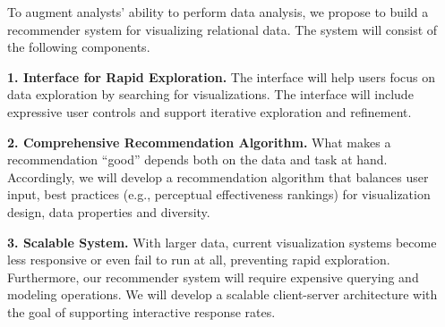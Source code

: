 To augment analysts’ ability to perform data analysis, we propose to build a recommender system for visualizing relational data. The system will consist of the following components.

\textbf{1. Interface for Rapid Exploration.}  The interface will help users focus on data exploration by searching for visualizations.  The interface will include expressive user controls and support iterative exploration and refinement.

\textbf{2. Comprehensive Recommendation Algorithm.}  What makes a recommendation “good” depends both on the data and task at hand. Accordingly, we will develop a recommendation algorithm that balances user input, best practices (e.g., perceptual effectiveness rankings) for visualization design, data properties and diversity.

\textbf{3. Scalable System.} With larger data, current visualization systems become less responsive or even fail to run at all, preventing rapid exploration.  Furthermore, our recommender system will require expensive querying and modeling operations. We will develop a scalable client-server architecture with the goal of supporting interactive response rates.

